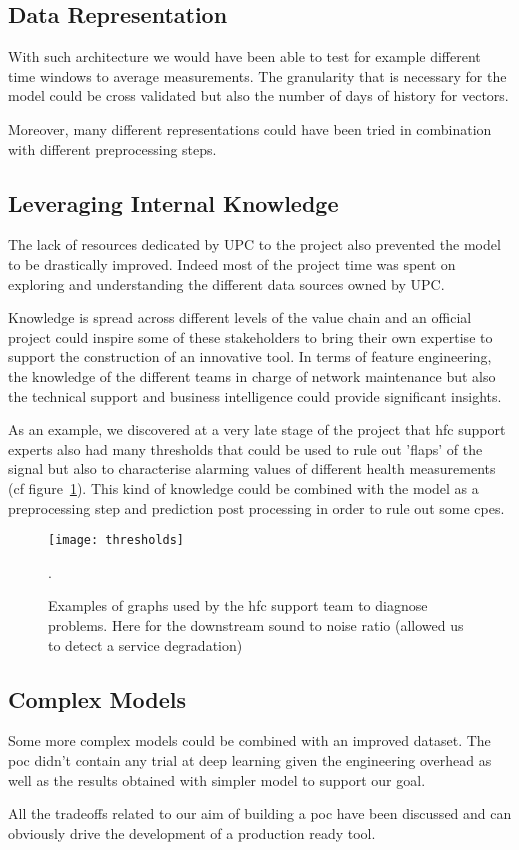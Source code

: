 \subsection{Data Representation}
With such architecture we would have been able to test for example different time windows to average measurements. The granularity that is necessary for the model could be cross validated but also the number of days of history for vectors. 

Moreover, many different representations could have been tried in combination with different preprocessing steps. 

\subsection{Leveraging Internal Knowledge}
The lack of resources dedicated by UPC to the project also prevented the model to be drastically improved. Indeed most of the project time was spent on exploring and understanding the different data sources owned by UPC. 

Knowledge is spread across different levels of the value chain and an official project could inspire some of these stakeholders to bring their own expertise to support the construction of an innovative tool. In terms of feature engineering, the knowledge of the different teams in charge of network maintenance but also the technical support and business intelligence could provide significant insights.

As an example, we discovered at a very late stage of the project that \acrshort{hfc} support experts also had many thresholds that could be used to rule out 'flaps' of the signal but also to characterise alarming values of different health measurements (cf figure~\ref{thresholds}). This kind of knowledge could be combined with the model as a preprocessing step and prediction post processing in order to rule out some \acrshort{cpe}s. 

\begin{figure}[ht]
    \begin{center}
    \texttt{[image: thresholds]}
    \end{center}
    \caption{Examples of graphs used by the \acrshort{hfc} support team to diagnose problems. Here for the downstream sound to noise ratio (allowed us to detect a service degradation)}.
    \label{thresholds}
\end{figure}

\subsection{Complex Models}
Some more complex models could be combined with an improved dataset. The \acrshort{poc} didn't contain any trial at deep learning given the engineering overhead as well as the results obtained with simpler model to support our goal.

\vspace{\baselineskip} 
All the tradeoffs related to our aim of building a \acrshort{poc} have been discussed and can obviously drive the development of a production ready tool.








